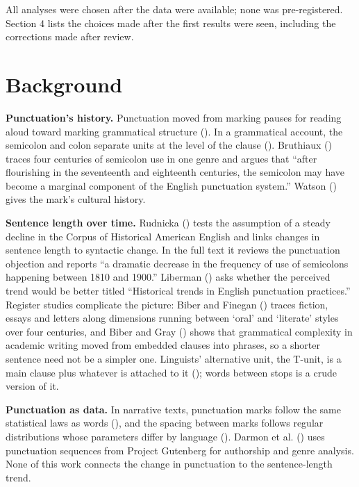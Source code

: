 \documentclass[
  11pt,
]{article}
\newcounter{none} %
\begin{document}
All analyses were chosen after the data were available; none was pre-registered. Section 4 lists the choices made after the first results were seen, including the corrections made after review.

\section{Background}\label{background}

\textbf{Punctuation's history.} Punctuation moved from marking pauses for reading aloud toward marking grammatical structure (). In a grammatical account, the
semicolon and colon separate units at the level of the clause (). Bruthiaux () traces four centuries of semicolon use in one
genre and argues that ``after flourishing in the seventeenth and eighteenth centuries, the semicolon may have become a marginal component of the English punctuation system.'' Watson
() gives the mark's cultural history.

\textbf{Sentence length over time.} Rudnicka () tests the assumption of a steady decline in the Corpus of Historical American English and links changes in sentence
length to syntactic change. In the full text it reviews the punctuation objection and reports ``a dramatic decrease in the frequency of use of semicolons happening between 1810 and 1900.'' Liberman
() asks whether the perceived trend would be better titled ``Historical trends in English punctuation practices.'' Register studies complicate the picture: Biber and
Finegan () traces fiction, essays and letters along dimensions running between `oral' and `literate' styles over four centuries, and Biber and Gray
() shows that grammatical complexity in academic writing moved from embedded clauses into phrases, so a shorter sentence need not be a simpler one. Linguists' alternative
unit, the T-unit, is a main clause plus whatever is attached to it (); words between stops is a crude version of it.

\textbf{Punctuation as data.} In narrative texts, punctuation marks follow the same statistical laws as words (), and the spacing between marks follows
regular distributions whose parameters differ by language (). Darmon et al. () uses punctuation sequences from Project
Gutenberg for authorship and genre analysis. None of this work connects the change in punctuation to the sentence-length trend.
\end{document}
